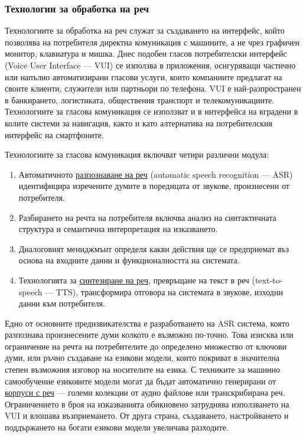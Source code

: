 \begin{multicols}{2}
\subsubsection{Технологии за обработка на реч}

Технологиите за обработка на реч служат за създаването на интерфейс, който позволява на потребителя директна комуникация с машините, а не чрез графичен монитор, клавиатура и мишка. Днес подобен гласов
 потребителски интерфейс (Voice User Interface — VUI) се използва в приложения, осигуряващи частично или напълно
 автоматизирани гласови услуги, които компаниите предлагат на своите клиенти, служители или партньори
 по телефона. VUI е най-разпространен в банкирането, логистиката,
 обществения транспорт и телекомуникациите.
 Технологиите за гласова комуникация се използват и в интерфейса на вградени в колите системи за навигация, както и като алтернатива на потребителския
 интерфейс на смартфоните.

Технологиите за гласова комуникация включват четири различни модула:
\begin{enumerate}
\item Автоматичното \uline{разпознаване на реч}  (automatic speech recognition — ASR)  идентифицира изречените думите в поредицата от звукове, произнесени от потребителя.
\item Разбирането на речта на потребителя включва анализ на синтактичната структура и семантична интерпретация  на изказването.
\item Диалоговият мениджмънт определя какви действия ще се предприемат въз основа на входните данни и функционалността на системата.

\item Технологията за \uline{синтезиране на реч}, превръщане на текст в
 реч (text-to-speech — TTS), трансформира отговора на системата в
 звукове, изходни данни към потребителя.
\end{enumerate}

Едно от основните предизвикателства е разработването на ASR система, която разпознава произнесените думи колкото е възможно по-точно. Това изисква или
 ограничение на речта на потребителите до определено множество от ключови думи, или ръчно създаване на езикови модели, които покриват
в значителна степен възможния изговор на носителите на езика.
С техниките за машинно самообучение езиковите модели могат да бъдат автоматично генерирани от \uline{корпуси с реч} — големи колекции от аудио файлове или транскрибирана реч.
Ограничението в броя на изказванията обикновено затруднява  използването на VUI  и влошава възприемането. От друга страна, създаването, настройването и поддържането на богати  езикови модели увеличава разходите.
 

\end{multicols}
